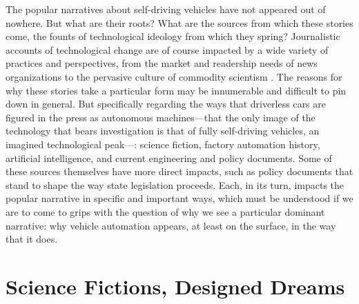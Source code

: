 The popular narratives about self-driving vehicles have not appeared
out of nowhere. But what are their roots? What are the sources from which
these stories come, the founts of technological ideology from which
they spring? Journalistic accounts of technological change are of
course impacted by a wide variety of practices and perspectives, from
the market and readership needs of news organizations to the pervasive
culture of commodity scientism \cite{smithSelling}. The
reasons for why these stories take a particular form may be innumerable
and difficult to pin down in general. But specifically regarding the ways that
driverless cars are figured in the press as autonomous
machines---that the only image of the technology that bears
investigation is that of fully self-driving vehicles, an imagined
technological peak---: science fiction, factory automation history,
artificial intelligence, and current engineering and policy documents. Some of
these sources themselves have more direct impacts, such as
policy documents that stand to shape the way state legislation proceeds. Each,
in its turn, impacts the popular narrative in specific and important
ways, which must be understood if we are to come to grips with the
question of why we see a particular dominant narrative:  why vehicle
automation appears, at least on the surface, in the way that it does.

\section{Science Fictions, Designed Dreams}

